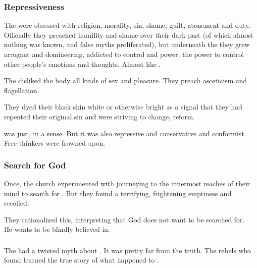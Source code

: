 \subsubsection{Repressiveness}
The \Merkyrans were obsessed with religion, morality, sin, shame, guilt, atonement and duty. Officially they preached humility and shame over their dark past (of which almost nothing was known, and false myths proliferated), but underneath the \facade{} they grew arrogant and domineering, addicted to control and power, the power to control other people's emotions and thoughts. 
Almost like . 

The \Merkyrans{} disliked the body all kinds of sex and pleasure. 
They preach asceticism and flagellation.

They dyed their black skin white or otherwise bright as a signal that they had repented their original sin and were striving to change, reform.

\Merkyrah{} was just, in a sense. 
But it was also repressive and conservative and conformist. 
Free-thinkers were frowned upon. 







\subsubsection{Search for God}
Once, the \Merkyran{} church experimented with journeying to the innermost reaches of their mind to search for . 
But they found a terrifying, frightening emptiness and recoiled. 

They rationalized this, interpreting that God does not want to be searched for. 
He wants to be blindly believed in. 





\subsubsection{\Thanatzil}
The \Merkyrans{} had a twisted myth about \Thanatzil. 
It was pretty far from the truth. 
The rebels who found \Semiza{} learned the true story of what happened to \Thanatzil. 

